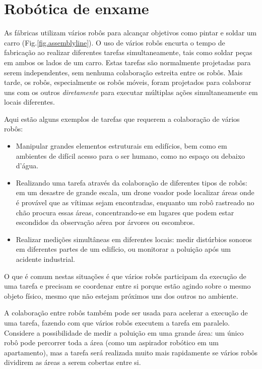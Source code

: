 
\chapter{Robótica de enxame}\label{ch.swarm}

As fábricas utilizam vários robôs para alcançar objetivos como pintar e soldar um carro (Fig.\ref{fig.assemblyline}). O uso de vários robôs encurta o tempo de fabricação ao realizar diferentes tarefas simultaneamente, tais como soldar peças em ambos os lados de um carro. Estas tarefas são normalmente projetadas para serem independentes, sem nenhuma colaboração estreita entre os robôs. Mais tarde, os robôs, especialmente os robôs móveis, foram projetados para colaborar uns com os outros \emph{diretamente} para executar múltiplas ações simultaneamente em locais diferentes.

Aqui estão alguns exemplos de tarefas que requerem a colaboração de vários robôs:
\begin{itemize}
\item Manipular grandes elementos estruturais em edifícios, bem como em ambientes de difícil acesso para o ser humano, como no espaço ou debaixo d'água.
\item Realizando uma tarefa através da colaboração de diferentes tipos de robôs: em um desastre de grande escala, um drone voador pode localizar áreas onde é provável que as vítimas sejam encontradas, enquanto um robô rastreado no chão procura essas áreas, concentrando-se em lugares que podem estar escondidos da observação aérea por árvores ou escombros.
\item Realizar medições simultâneas em diferentes locais: medir distúrbios sonoros em diferentes partes de um edifício, ou monitorar a poluição após um acidente industrial. 
\end{itemize}
O que é comum nestas situações é que vários robôs participam da execução de uma tarefa e precisam se coordenar entre si porque estão agindo sobre o mesmo objeto físico, mesmo que não estejam próximos uns dos outros no ambiente. 

A colaboração entre robôs também pode ser usada para acelerar a execução de uma tarefa, fazendo com que vários robôs executem a tarefa em paralelo. Considere a possibilidade de medir a poluição em uma grande área: um único robô pode percorrer toda a área (como um aspirador robótico em um apartamento), mas a tarefa será realizada muito mais rapidamente se vários robôs dividirem as áreas a serem cobertas entre si.

